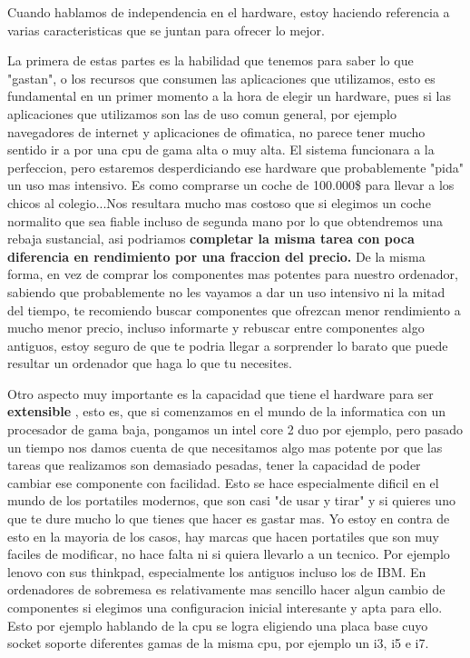 Cuando hablamos de independencia en el hardware, estoy haciendo referencia a varias caracteristicas que se juntan para ofrecer lo mejor. 

La primera de estas partes es la habilidad que tenemos para saber lo que "gastan", o los recursos que consumen las aplicaciones que utilizamos, esto es fundamental en un primer momento a la hora de elegir un hardware, pues si las aplicaciones que utilizamos son las de uso comun general, por ejemplo navegadores de internet y aplicaciones de ofimatica, no parece tener mucho sentido ir a por una cpu de gama alta o muy alta. El sistema funcionara a la perfeccion, pero estaremos desperdiciando ese hardware que probablemente "pida" un uso mas intensivo. Es como comprarse un coche de 100.000\$ para llevar a los chicos al colegio...Nos resultara mucho mas costoso que si elegimos un coche normalito que sea fiable incluso de segunda mano por lo que obtendremos una rebaja sustancial, asi podriamos \textbf{ completar la misma tarea con poca diferencia en rendimiento por una fraccion del precio. } De la misma forma, en vez de comprar los componentes mas potentes para nuestro ordenador, sabiendo que probablemente no les vayamos a dar un uso intensivo ni la mitad del tiempo, te recomiendo buscar componentes que ofrezcan menor rendimiento a mucho menor precio, incluso informarte y rebuscar entre componentes algo antiguos, estoy seguro de que te podria llegar a sorprender lo barato que puede resultar un ordenador que haga lo que tu necesites.

Otro aspecto muy importante es la capacidad que tiene el hardware para ser \textbf{ extensible }, esto es, que si comenzamos en el mundo de la informatica con un procesador de gama baja, pongamos un intel core 2 duo por ejemplo, pero pasado un tiempo nos damos cuenta de que necesitamos algo mas potente por que las tareas que realizamos son demasiado pesadas, tener la capacidad de poder cambiar ese componente con facilidad. Esto se hace especialmente dificil en el mundo de los portatiles modernos, que son casi "de usar y tirar" y si quieres uno que te dure mucho lo que tienes que hacer es gastar mas. Yo estoy en contra de esto en la mayoria de los casos, hay marcas que hacen portatiles que son muy faciles de modificar, no hace falta ni si quiera llevarlo a un tecnico. Por ejemplo lenovo con sus thinkpad, especialmente los antiguos incluso los de IBM. En ordenadores de sobremesa es relativamente mas sencillo hacer algun cambio de componentes si elegimos una configuracion inicial interesante y apta para ello. Esto por ejemplo hablando de la cpu se logra eligiendo una placa base cuyo socket soporte diferentes gamas de la misma cpu, por ejemplo un i3, i5 e i7. 

